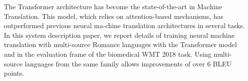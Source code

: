 The Transformer architecture has become the state-of-the-art in Machine Translation. This model, which relies on attention-based mechanisms, has outperformed previous neural ma-chine translation architectures in several tasks. In this system description paper, we report details of training neural machine translation with multi-source Romance languages with the Transformer model and in the evaluation frame of the biomedical WMT 2018 task. Using multi-source languages from the same family allows improvements of over 6 BLEU points.
